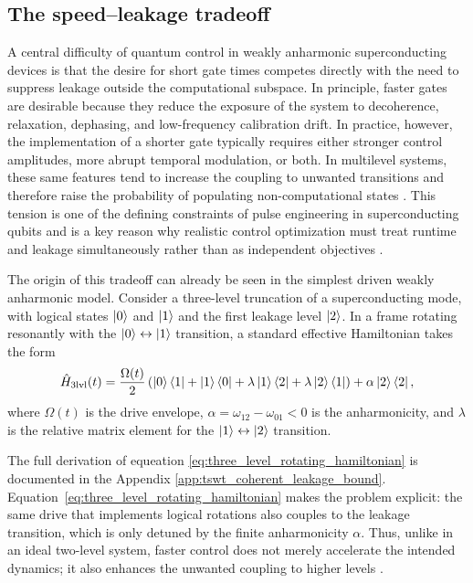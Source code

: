 \subsection{The speed--leakage tradeoff}
\label{subsec:speed_leakage_tradeoff}

A central difficulty of quantum control in weakly anharmonic superconducting devices is that the desire for short gate times competes directly with the need to suppress leakage outside the computational subspace. In principle, faster gates are desirable because they reduce the exposure of the system to decoherence, relaxation, dephasing, and low-frequency calibration drift. In practice, however, the implementation of a shorter gate typically requires either stronger control amplitudes, more abrupt temporal modulation, or both. In multilevel systems, these same features tend to increase the coupling to unwanted transitions and therefore raise the probability of populating non-computational states \cite{Motzoi2009,Gambetta2011,Werninghaus2021}. This tension is one of the defining constraints of pulse engineering in superconducting qubits and is a key reason why realistic control optimization must treat runtime and leakage simultaneously rather than as independent objectives \cite{Niu2019}.


The origin of this tradeoff can already be seen in the simplest driven weakly anharmonic model. Consider a three-level truncation of a superconducting mode, with logical states $\ket{0}$ and $\ket{1}$ and the first leakage level $\ket{2}$. In a frame rotating resonantly with the $\ket{0}\leftrightarrow\ket{1}$ transition, a standard effective Hamiltonian takes the form
\begin{equation}
    \hat{H}_{\mathrm{3lvl}}(t)
    =
    \frac{\Omega(t)}{2}
    \left(
        \ket{0}\bra{1} + \ket{1}\bra{0}
        + \lambda \ket{1}\bra{2} + \lambda \ket{2}\bra{1}
        \right)
        +
        \alpha \ket{2}\bra{2},
        \label{eq:three_level_rotating_hamiltonian}
    \end{equation}
where $\Omega(t)$ is the drive envelope, $\alpha=\omega_{12}-\omega_{01}<0$ is the anharmonicity, and $\lambda$ is the relative matrix element for the $\ket{1}\leftrightarrow\ket{2}$ transition.


The full derivation of equeation \eqref{eq:three_level_rotating_hamiltonian} is documented in the Appendix \ref{app:tswt_coherent_leakage_bound}.
Equation~\eqref{eq:three_level_rotating_hamiltonian} makes the problem explicit: the same drive that implements logical rotations also couples to the leakage transition, which is only detuned by the finite anharmonicity $\alpha$. Thus, unlike in an ideal two-level system, faster control does not merely accelerate the intended dynamics; it also enhances the unwanted coupling to higher levels \cite{Motzoi2009,Gambetta2011,Krantz2019}.

